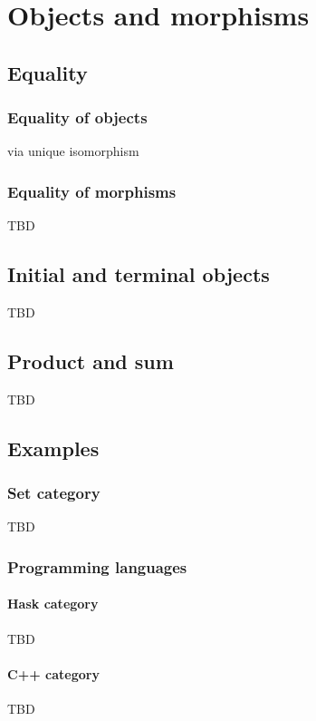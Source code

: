 \chapter{Objects and morphisms}

\section{Equality}

\subsection{Equality of objects}
via unique isomorphism

\subsection{Equality of morphisms}
TBD

\section{Initial and terminal objects}
TBD

\section{Product and sum}
TBD

\section{Examples}

\subsection{\textbf{Set} category}
TBD

\subsection{Programming languages}
\subsubsection{\textbf{Hask} category}
TBD
\subsubsection{\textbf{C++} category}
TBD


